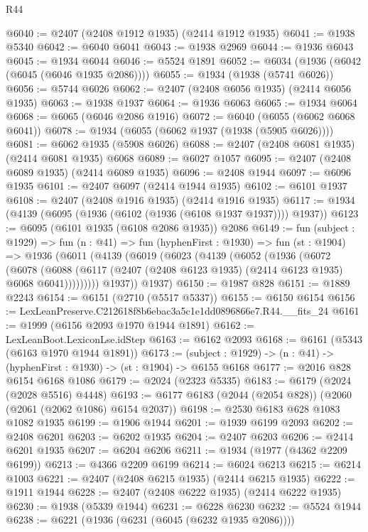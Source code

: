 \begin{lexlean}{R44}
\begin{coremodule}
@6040 := @2407 (@2408 @1912 @1935) (@2414 @1912 @1935)
@6041 := @1938 @5340
@6042 := @6040 @6041
@6043 := @1938 @2969
@6044 := @1936 @6043
@6045 := @1934 @6044
@6046 := @5524 @1891
@6052 := @6034 (@1936 (@6042 (@6045 (@6046 @1935 @2086))))
@6055 := @1934 (@1938 (@5741 @6026))
@6056 := @5744 @6026
@6062 := @2407 (@2408 @6056 @1935) (@2414 @6056 @1935)
@6063 := @1938 @1937
@6064 := @1936 @6063
@6065 := @1934 @6064
@6068 := @6065 (@6046 @2086 @1916)
@6072 := @6040 (@6055 (@6062 @6068 @6041))
@6078 := @1934 (@6055 (@6062 @1937 (@1938 (@5905 @6026))))
@6081 := @6062 @1935 (@5908 @6026)
@6088 := @2407 (@2408 @6081 @1935) (@2414 @6081 @1935) @6068
@6089 := @6027 @1057
@6095 := @2407 (@2408 @6089 @1935) (@2414 @6089 @1935)
@6096 := @2408 @1944
@6097 := @6096 @1935
@6101 := @2407 @6097 (@2414 @1944 @1935)
@6102 := @6101 @1937
@6108 := @2407 (@2408 @1916 @1935) (@2414 @1916 @1935)
@6117 := @1934 (@4139 (@6095 (@1936 (@6102 (@1936 (@6108 @1937 @1937)))) @1937))
@6123 := @6095 (@6101 @1935 (@6108 @2086 @1935)) @2086
@6149 := fun (subject : @1929) =>
  fun (n : @41) =>
  fun (hyphenFirst : @1930) =>
  fun (st : @1904) =>
  @1936
    (@6011
      (@4139
        (@6019
          (@6023
            (@4139
              (@6052
                (@1936
                  (@6072
                    (@6078
                      (@6088
                        (@6117 (@2407 (@2408 @6123 @1935) (@2414 @6123 @1935) @6068 @6041)))))))))
          @1937))
      @1937)
@6150 := @1987 @828
@6151 := @1889 @2243
@6154 := @6151 (@2710 (@5517 @5337))
@6155 := @6150 @6154
@6156 := LexLeanPreserve.C212618f8b6ebac3a5c1e1dd0896866e7.R44.__fits_24
@6161 := @1999 (@6156 @2093 @1970 @1944 @1891)
@6162 := LexLeanBoot.LexiconLse.idStep
@6163 := @6162 @2093
@6168 := @6161 (@5343 (@6163 @1970 @1944 @1891))
@6173 := (subject : @1929) -> (n : @41) -> (hyphenFirst : @1930) -> (st : @1904) -> @6155 @6168
@6177 := @2016 @828 @6154 @6168 @1086
@6179 := @2024 (@2323 @5335)
@6183 := @6179 (@2024 (@2028 @5516) @4448)
@6193 := @6177 @6183 (@2044 (@2054 @828)) (@2060 (@2061 (@2062 @1086) @6154 @2037))
@6198 := @2530 @6183 @628 @1083 @1082 @1935
@6199 := @1906 @1944
@6201 := @1939 @6199 @2093
@6202 := @2408 @6201
@6203 := @6202 @1935
@6204 := @2407 @6203
@6206 := @2414 @6201 @1935
@6207 := @6204 @6206
@6211 := @1934 (@1977 (@4362 @2209 @6199))
@6213 := @4366 @2209 @6199
@6214 := @6024 @6213
@6215 := @6214 @1003
@6221 := @2407 (@2408 @6215 @1935) (@2414 @6215 @1935)
@6222 := @1911 @1944
@6228 := @2407 (@2408 @6222 @1935) (@2414 @6222 @1935)
@6230 := @1938 (@5339 @1944)
@6231 := @6228 @6230
@6232 := @5524 @1944
@6238 := @6221 (@1936 (@6231 (@6045 (@6232 @1935 @2086))))

\end{coremodule}
\end{lexlean}
